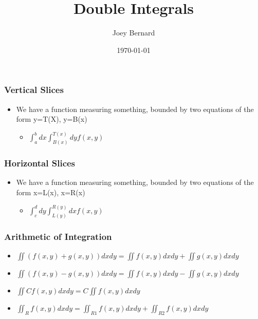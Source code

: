 \documentclass{beamer}
\title{Double Integrals}
\author{Joey Bernard}
\institute{University of New Brunswick}
\date{\today}
\begin{document}
\begin{frame}
  \titlepage
\end{frame}

\begin{frame}
  \frametitle{Vertical Slices}
  \begin{itemize}
  \item We have a function measuring something, bounded by two equations of the form y=T(X), y=B(x)
    \begin{itemize}
    \item $\int^b_a dx \int^{T(x)}_{B(x)} dy f(x,y)$
    \end{itemize}
  \end{itemize}
\end{frame}

\begin{frame}
  \frametitle{Horizontal Slices}
  \begin{itemize}
  \item We have a function measuring something, bounded by two equations of the form x=L(x), x=R(x)
    \begin{itemize}
    \item $\int^d_c dy \int^{R(y)}_{L(y)} dx f(x,y)$
    \end{itemize}
  \end{itemize}
\end{frame}

\begin{frame}
  \frametitle{Arithmetic of Integration}
  \begin{itemize}
  \item $\iint (f(x,y) + g(x,y)) dx dy = \iint f(x,y) dx dy + \iint g(x,y) dx dy$
  \item $\iint (f(x,y) - g(x,y)) dx dy = \iint f(x,y) dx dy - \iint g(x,y) dx dy$
  \item $\iint Cf(x,y) dx dy = C \iint f(x,y) dx dy$
  \item $\iint_R f(x,y) dx dy = \iint_{R1} f(x,y) dx dy + \iint_{R2} f(x,y) dx dy$
  \end{itemize}
\end{frame}
\end{document}
